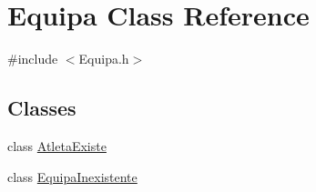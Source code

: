 \hypertarget{class_equipa}{}\section{Equipa Class Reference}
\label{class_equipa}


{\ttfamily \#include $<$Equipa.\+h$>$}

\subsection*{Classes}
\begin{DoxyCompactItemize}
\item 
class \hyperlink{class_equipa_1_1_atleta_existe}{Atleta\+Existe}
\item 
class \hyperlink{class_equipa_1_1_equipa_inexistente}{Equipa\+Inexistente}
\end{DoxyCompactItemize}
